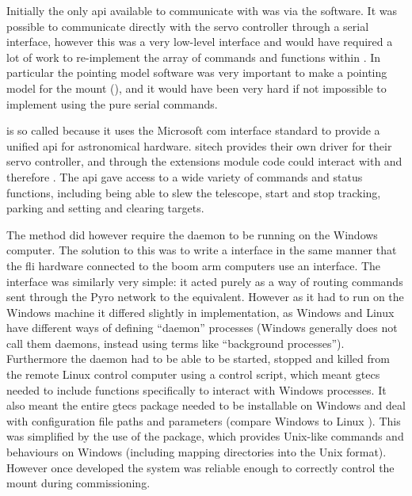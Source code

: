 \begin{colsection}
\begin{colsection}
Initially the only \gls{api} available to communicate with  was via the  software. It was possible to communicate directly with the servo controller through a serial interface, however this was a very low-level interface and would have required a lot of work to re-implement the array of commands and functions within . In particular the  pointing model software was very important to make a pointing model for the mount (), and it would have been very hard if not impossible to implement using the pure serial commands.

 is so called because it uses the Microsoft \gls{com} interface standard to provide a unified \gls{api} for astronomical hardware. \gls{sitech} provides their own  driver for their servo controller, and through the   extensions module  code could interact with  and therefore . The  \gls{api} gave access to a wide variety of commands and status functions, including being able to slew the telescope, start and stop tracking, parking and setting and clearing targets.

The  method did however require the  daemon to be running on the Windows computer. The solution to this was to write a  interface in the same manner that the \gls{fli} hardware connected to the boom arm computers use an  interface. The  interface was similarly very simple: it acted purely as a way of routing commands sent through the Pyro network to the  equivalent. However as it had to run on the Windows machine it differed slightly in implementation, as Windows and Linux have different ways of defining ``daemon'' processes (Windows generally does not call them daemons, instead using terms like ``background processes''). Furthermore the daemon had to be able to be started, stopped and killed from the remote Linux control computer using a  control script, which meant \gls{gtecs} needed to include functions specifically to interact with Windows processes. It also meant the entire \gls{gtecs} package needed to be installable on Windows and deal with configuration file paths and parameters (compare Windows  to Linux ). This was simplified by the use of the  package, which provides Unix-like commands and behaviours on Windows (including mapping directories into the Unix format). However once developed the system was reliable enough to correctly control the mount during commissioning.


\end{colsection}
\end{colsection}

